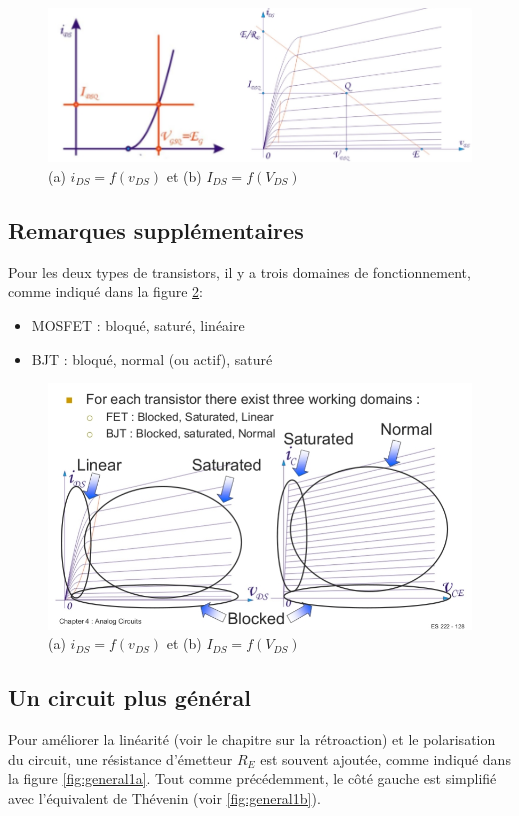 \begin{figure}[h!]
	\centering
	\includegraphics[width=14cm]{figures/ch02/mos_load2.jpg}
	\caption{(a) $i_{DS} = f(v_{DS})$ et (b) $I_{DS} = f(V_{DS})$}
	\label{fig:mos_load2}
\end{figure}


\subsection{Remarques supplémentaires}
Pour les deux types de transistors, il y a trois domaines de fonctionnement, comme indiqué dans la figure \ref{fig:transistor_overview}:
\begin{itemize}
	\item MOSFET : bloqué, saturé, linéaire
	\item BJT : bloqué, normal (ou actif), saturé
\end{itemize}
\begin{figure}[h!]
	\centering
	\includegraphics[width=12cm]{figures/ch02/overview.jpg}
	\caption{(a) $i_{DS} = f(v_{DS})$ et (b) $I_{DS} = f(V_{DS})$}
	\label{fig:transistor_overview}
\end{figure}
\subsection{Un circuit plus général}
\label{sec:general_circuit}
Pour améliorer la linéarité (voir le chapitre sur la rétroaction) et le polarisation du circuit, une résistance d'émetteur $R_E$ est souvent ajoutée, comme indiqué dans la figure \ref{fig:general1a}. Tout comme précédemment, le côté gauche est simplifié avec l'équivalent de Thévenin (voir \ref{fig:general1b}).

